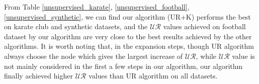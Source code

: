 \documentclass[\main/thesis.tex]{subfiles}
\begin{document}


From Table \ref{unsupervised_karate}, \ref{unsupervised_football}, \ref{unsupervised_synthetic}, we can find our algorithm (UR+K) performs the best on karate club and synthetic datasets, and the $\mathcal{UR}$ values achieved on football dataset by our algorithm are very close to the best results achieved by the  other algorithms. It is worth noting that, in the expansion steps, though UR algorithm always choose the node which gives the largest increase of $\mathcal{UR}$, while $\mathcal{UR}$ value is not mainly considered in the first a few steps in our algorithm, our algorithm finally achieved higher $\mathcal{UR}$ values than UR algorithm on all datasets.
\end{document}
